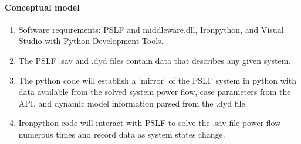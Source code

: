 \documentclass[12pt]{article}
\begin{document}
\paragraph{Conceptual model}
\begin{enumerate}
\item Software requirements: PSLF and middleware.dll, Ironpython, and Visual Studio with Python Development Tools.
\item The PSLF .sav and .dyd files contain data that describes any given system.
\item The python code will establish a 'mirror' of the PSLF system in python with data available from the solved system power flow, case parameters from the API, and dynamic model information parsed from the .dyd file.
\item Ironpython code will interact with PSLF to solve the .sav file power flow numerous times and record data as system states change.


\end{enumerate}
\end{document}
